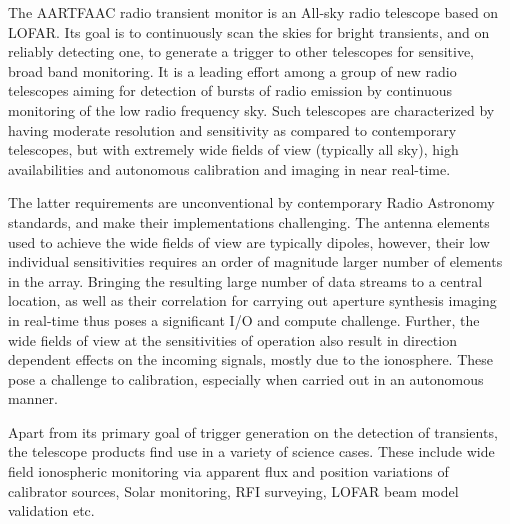 \documentclass{ws-jai}
\begin{document}


The AARTFAAC  radio transient  monitor is  an All-sky  radio telescope  based on
LOFAR. Its goal is to continuously scan  the skies for bright transients, and on
reliably detecting one, to generate a trigger to other telescopes for sensitive,
broad  band monitoring.   It is  a leading  effort among  a group  of new  radio
telescopes  aiming for  detection  of  bursts of  radio  emission by  continuous
monitoring of the low radio frequency sky.  Such telescopes are characterized by
having  moderate   resolution  and  sensitivity  as   compared  to  contemporary
telescopes, but  with extremely wide  fields of  view (typically all  sky), high
availabilities and autonomous calibration and imaging in near real-time.

The  latter  requirements are  unconventional  by  contemporary Radio  Astronomy
standards, and make their implementations challenging. The antenna elements used
to achieve  the wide fields  of view are  typically dipoles, however,  their low
individual  sensitivities  requires  an  order of  magnitude  larger  number  of
elements in the array.  Bringing the resulting large number of data streams to a
central  location,  as well  as  their  correlation  for carrying  out  aperture
synthesis  imaging  in  real-time  thus  poses a  significant  I/O  and  compute
challenge. Further,  the wide fields of  view at the sensitivities  of operation
also result in  direction dependent effects on the incoming  signals, mostly due
to  the ionosphere.  These  pose  a challenge  to  calibration, especially  when
carried out in an autonomous manner.

Apart  from  its  primary  goal  of  trigger  generation  on  the  detection  of
transients, the telescope products find use in a variety of science cases. These
include  wide  field  ionospheric  monitoring via  apparent  flux  and  position
variations of  calibrator sources, Solar  monitoring, RFI surveying,  LOFAR beam
model validation etc.
\end{document}
